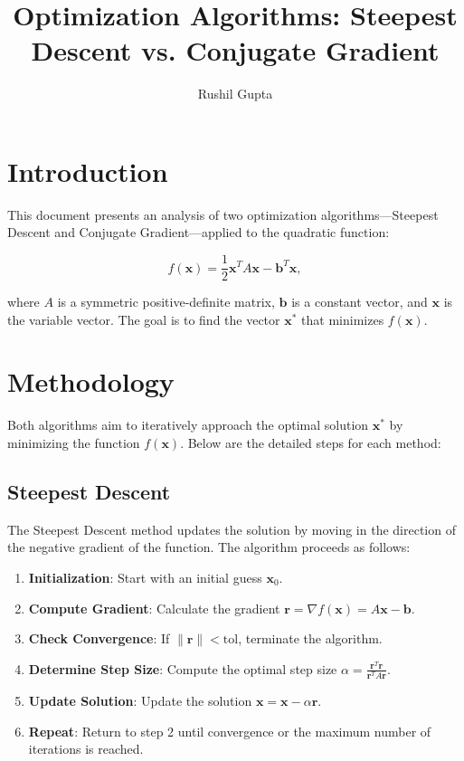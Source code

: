 \documentclass[a4paper, 12pt]{article}
\title{\Large\textbf{Optimization Algorithms: Steepest Descent vs. Conjugate Gradient}}
\author{Rushil Gupta}
\date{}
\begin{document}
\maketitle

\section*{Introduction}

This document presents an analysis of two optimization algorithms—Steepest Descent and Conjugate Gradient—applied to the quadratic function:

\[
f(\mathbf{x}) = \frac{1}{2} \mathbf{x}^T A \mathbf{x} - \mathbf{b}^T \mathbf{x},
\]

where \( A \) is a symmetric positive-definite matrix, \( \mathbf{b} \) is a constant vector, and \( \mathbf{x} \) is the variable vector. The goal is to find the vector \( \mathbf{x}^* \) that minimizes \( f(\mathbf{x}) \).

\section*{Methodology}

Both algorithms aim to iteratively approach the optimal solution \( \mathbf{x}^* \) by minimizing the function \( f(\mathbf{x}) \). Below are the detailed steps for each method:

\subsection*{Steepest Descent}

The Steepest Descent method updates the solution by moving in the direction of the negative gradient of the function. The algorithm proceeds as follows:

\begin{enumerate}
    \item \textbf{Initialization}: Start with an initial guess \( \mathbf{x}_0 \).
    \item \textbf{Compute Gradient}: Calculate the gradient \( \mathbf{r} = \nabla f(\mathbf{x}) = A\mathbf{x} - \mathbf{b} \).
    \item \textbf{Check Convergence}: If \( \|\mathbf{r}\| < \text{tol} \), terminate the algorithm.
    \item \textbf{Determine Step Size}: Compute the optimal step size \( \alpha = \frac{\mathbf{r}^T \mathbf{r}}{\mathbf{r}^T A \mathbf{r}} \).
    \item \textbf{Update Solution}: Update the solution \( \mathbf{x} = \mathbf{x} - \alpha \mathbf{r} \).
    \item \textbf{Repeat}: Return to step 2 until convergence or the maximum number of iterations is reached.
\end{enumerate}
\end{document}
